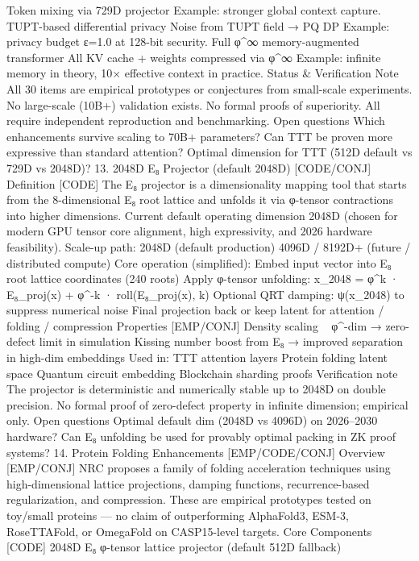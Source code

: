 Token mixing via 729D projector
Example: stronger global context capture.
TUPT-based differential privacy
Noise from TUPT field → PQ DP
Example: privacy budget ε=1.0 at 128-bit security.
Full φ^∞ memory-augmented transformer
All KV cache + weights compressed via φ^∞
Example: infinite memory in theory, 10× effective context in practice.
Status & Verification Note
All 30 items are empirical prototypes or conjectures from small-scale experiments.
No large-scale (10B+) validation exists.
No formal proofs of superiority.
All require independent reproduction and benchmarking.
Open questions
Which enhancements survive scaling to 70B+ parameters?
Can TTT be proven more expressive than standard attention?
Optimal dimension for TTT (512D default vs 729D vs 2048D)?
13. 2048D E₈ Projector (default 2048D) [CODE/CONJ]
Definition [CODE]
The E₈ projector is a dimensionality mapping tool that starts from the 8-dimensional E₈ root lattice and unfolds it via φ-tensor contractions into higher dimensions.
Current default operating dimension
2048D
(chosen for modern GPU tensor core alignment, high expressivity, and 2026 hardware feasibility).
Scale-up path:
2048D (default production)
4096D / 8192D+ (future / distributed compute)
Core operation (simplified):
Embed input vector into E₈ root lattice coordinates (240 roots)
Apply φ-tensor unfolding:
x_{2048} = φ^k · E₈_proj(x) + φ^{-k} · roll(E₈_proj(x), k)
Optional QRT damping: ψ(x_{2048}) to suppress numerical noise
Final projection back or keep latent for attention / folding / compression
Properties [EMP/CONJ]
Density scaling ~ φ^{-dim} → zero-defect limit in simulation
Kissing number boost from E₈ → improved separation in high-dim embeddings
Used in:
TTT attention layers
Protein folding latent space
Quantum circuit embedding
Blockchain sharding proofs
Verification note
The projector is deterministic and numerically stable up to 2048D on double precision.
No formal proof of zero-defect property in infinite dimension; empirical only.
Open questions
Optimal default dim (2048D vs 4096D) on 2026–2030 hardware?
Can E₈ unfolding be used for provably optimal packing in ZK proof systems?
14. Protein Folding Enhancements [EMP/CODE/CONJ]
Overview [EMP/CONJ]
NRC proposes a family of folding acceleration techniques using high-dimensional lattice projections, damping functions, recurrence-based regularization, and compression.
These are empirical prototypes tested on toy/small proteins — no claim of outperforming AlphaFold3, ESM-3, RoseTTAFold, or OmegaFold on CASP15-level targets.
Core Components [CODE]
2048D E₈ φ-tensor lattice projector (default 512D fallback)
